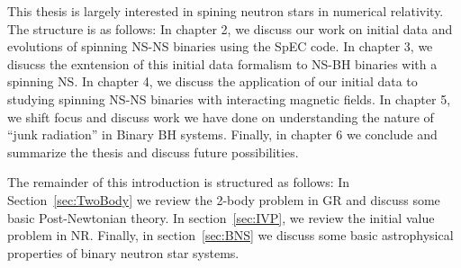 This thesis is largely interested in spining neutron stars in numerical relativity. The structure is as follows: In chapter 2, we discuss our work on initial data and evolutions of spinning NS-NS binaries using the SpEC code. In chapter 3, we disucss the exntension of this initial data formalism to NS-BH binaries with a spinning NS. In chapter 4, we discuss the application of our initial data to studying spinning NS-NS binaries with interacting magnetic fields. In chapter 5, we shift focus and discuss work we have done on understanding the nature of ``junk radiation'' in Binary BH systems. Finally, in chapter 6 we conclude and summarize the thesis and discuss future possibilities.

The remainder of this introduction is structured as follows: In Section~\ref{sec:TwoBody} we review the 2-body problem in GR and discuss some basic Post-Newtonian theory. In section~\ref{sec:IVP}, we review the initial value problem in NR. Finally, in section~\ref{sec:BNS} we discuss some basic astrophysical properties of binary neutron star systems.




